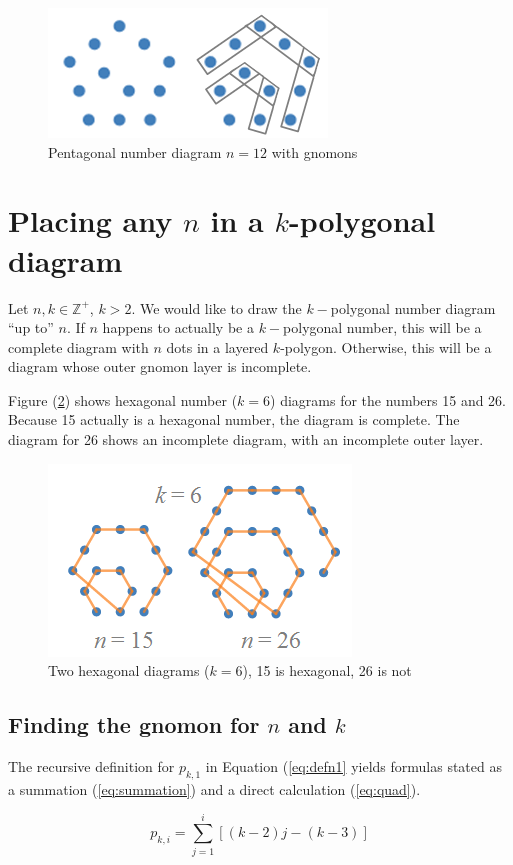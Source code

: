 \documentclass[notitlepage]{report}
\begin{document}
\begin{figure}[!htb]
    \centering
    \includegraphics[width=0.3\linewidth]{pentagon_with_gnomon.PNG}
    \caption{Pentagonal number diagram $n=12$ with gnomons}
    \label{fig:gnomons}
\end{figure}

\section*{Placing any $n$ in a $k$-polygonal diagram}

Let $n,k \in \mathbb{Z}^{+}$, $k > 2$. We would like to draw the $k-$polygonal number diagram ``up to'' $n$. If $n$ happens to actually be a $k-$polygonal number, this will be a complete diagram with $n$ dots in a layered $k$-polygon. Otherwise, this will be a diagram whose outer gnomon layer is incomplete.

Figure (\ref{fig:hexagonals}) shows hexagonal number ($k = 6$) diagrams for the numbers 15 and 26. Because 15 actually is a hexagonal number, the diagram is complete. The diagram for 26 shows an incomplete diagram, with an incomplete outer layer.

\begin{figure}[!htb]
    \centering
    \includegraphics[width=0.3\linewidth]{hexagonal_and_no.PNG}
    \caption{Two hexagonal diagrams ($k = 6$), 15 is hexagonal, 26 is not}
    \label{fig:hexagonals}
\end{figure}


\subsection*{Finding the gnomon for $n$ and $k$}

The recursive definition for $p_{k,1}$ in Equation (\ref{eq:defn1} yields formulas stated as a summation (\ref{eq:summation}) and a direct calculation (\ref{eq:quad}).

\begin{equation}
    p_{k,i} = \sum^{i}_{j=1}\left[(k-2)j-(k-3)\right]
    \label{eq:summation}
\end{equation}
\end{document}
